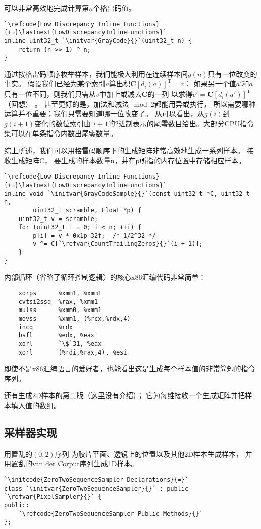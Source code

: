 可以非常高效地完成计算第$n$个格雷码值。
\begin{lstlisting}
`\refcode{Low Discrepancy Inline Functions}{+=}\lastnext{LowDiscrepancyInlineFunctions}`
inline uint32_t `\initvar{GrayCode}{}`(uint32_t n) {
    return (n >> 1) ^ n;
}
\end{lstlisting}

通过按格雷码顺序枚举样本，我们能极大利用在连续样本间$g(n)$只有一位改变的事实。
假设我们已经为某个索引$a$算出积${\bm C}[d_i(a)]^{\mathrm{T}}=v$：
如果另一个值$a'$和$a$只有一位不同，则我们只需从$v$中加上或减去$\bm C$的一列
以求得$v'={\bm C}[d_i(a')]^{\mathrm{T}}$（回想）
。
甚至更好的是，加法和减法$\mod{2}$都能用异或执行，
所以需要哪种运算并不重要；我们只需要知道哪一位改变了。
从可以看出，从$g(i)$到$g(i+1)$变化的数位索引由
$i+1$的2进制表示的尾零数目给出。大部分CPU指令集可以在单条指令内数出尾零数量。

综上所述，我们可以用格雷码顺序下的生成矩阵非常高效地生成一系列样本。
接收生成矩阵{\ttfamily C}，
要生成的样本数量{\ttfamily n}，并在{\ttfamily p}所指的内存位置中存储相应样本。
\begin{lstlisting}
`\refcode{Low Discrepancy Inline Functions}{+=}\lastnext{LowDiscrepancyInlineFunctions}`
inline void `\initvar{GrayCodeSample}{}`(const uint32_t *C, uint32_t n,
        uint32_t scramble, Float *p) {
    uint32_t v = scramble;
    for (uint32_t i = 0; i < n; ++i) {
        p[i] = v * 0x1p-32f;  /* 1/2^32 */
        v ^= C[`\refvar{CountTrailingZeros}{}`(i + 1)];
    }
}
\end{lstlisting}

内部循环（省略了循环控制逻辑）的核心x86汇编代码非常简单：
\begin{lstlisting}
    xorps      %xmm1, %xmm1
    cvtsi2ssq  %rax, %xmm1
    mulss      %xmm0, %xmm1
    movss      %xmm1, (%rcx,%rdx,4)
    incq       %rdx
    bsfl       %edx, %eax
    xorl       `\$`31, %eax
    xorl       (%rdi,%rax,4), %esi
\end{lstlisting}

即使不是x86汇编语言的爱好者，也能看出这是生成每个样本值的非常简短的指令序列。

还有生成2D样本的第二版（这里没有介绍）；
它为每维接收一个生成矩阵并把样本填入{}值的数组。

\subsection{采样器实现}\label{sub:采样器实现02}
用置乱的$(0,2)$序列
为胶片平面、透镜上的位置以及其他2D样本生成样本，
并用置乱的van der Corput序列生成1D样本。
\begin{lstlisting}
`\initcode{ZeroTwoSequenceSampler Declarations}{=}`
class `\initvar{ZeroTwoSequenceSampler}{}` : public `\refvar{PixelSampler}{}` {
public:
    `\refcode{ZeroTwoSequenceSampler Public Methods}{}`
};
\end{lstlisting}